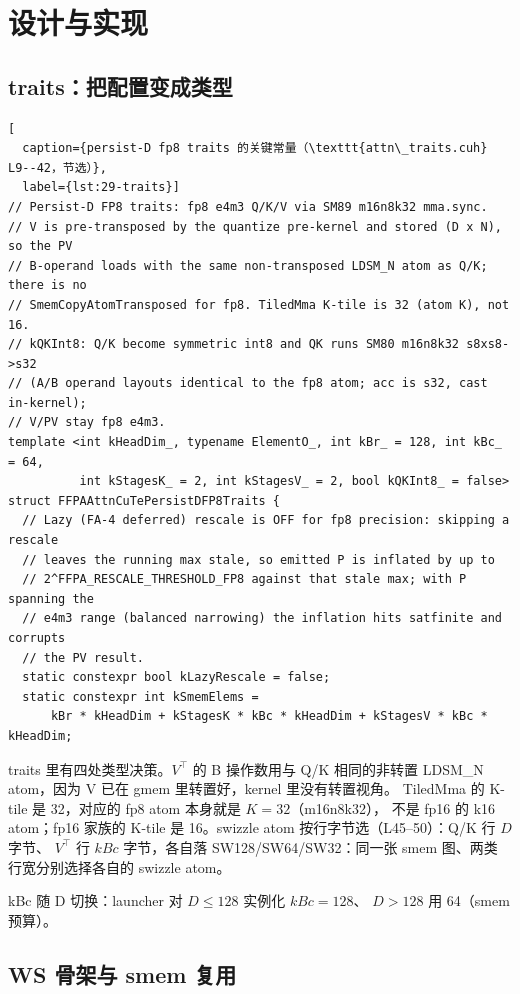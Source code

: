 \section{设计与实现}

\subsection{traits：把配置变成类型}

\begin{lstlisting}[
  caption={persist-D fp8 traits 的关键常量（\texttt{attn\_traits.cuh} L9--42，节选）},
  label={lst:29-traits}]
// Persist-D FP8 traits: fp8 e4m3 Q/K/V via SM89 m16n8k32 mma.sync.
// V is pre-transposed by the quantize pre-kernel and stored (D x N), so the PV
// B-operand loads with the same non-transposed LDSM_N atom as Q/K; there is no
// SmemCopyAtomTransposed for fp8. TiledMma K-tile is 32 (atom K), not 16.
// kQKInt8: Q/K become symmetric int8 and QK runs SM80 m16n8k32 s8xs8->s32
// (A/B operand layouts identical to the fp8 atom; acc is s32, cast in-kernel);
// V/PV stay fp8 e4m3.
template <int kHeadDim_, typename ElementO_, int kBr_ = 128, int kBc_ = 64,
          int kStagesK_ = 2, int kStagesV_ = 2, bool kQKInt8_ = false>
struct FFPAAttnCuTePersistDFP8Traits {
  // Lazy (FA-4 deferred) rescale is OFF for fp8 precision: skipping a rescale
  // leaves the running max stale, so emitted P is inflated by up to
  // 2^FFPA_RESCALE_THRESHOLD_FP8 against that stale max; with P spanning the
  // e4m3 range (balanced narrowing) the inflation hits satfinite and corrupts
  // the PV result.
  static constexpr bool kLazyRescale = false;
  static constexpr int kSmemElems =
      kBr * kHeadDim + kStagesK * kBc * kHeadDim + kStagesV * kBc * kHeadDim;
\end{lstlisting}

traits 里有四处类型决策。$V^{\top}$ 的 B 操作数用与 Q/K 相同的非转置
LDSM\_N atom，因为 V 已在 gmem 里转置好，kernel 里没有转置视角。
TiledMma 的 K-tile 是 32，对应的 fp8 atom 本身就是 $K{=}32$（m16n8k32），
不是 fp16 的 k16 atom；fp16 家族的 K-tile 是 16。swizzle atom 按行字节选（L45--50）：Q/K 行 $D$ 字节、
$V^{\top}$ 行 $kBc$ 字节，各自落 SW128/SW64/SW32：同一张 smem 图、两类
行宽分别选择各自的 swizzle atom。

kBc 随 D 切换：launcher 对 $D\le128$ 实例化 $kBc{=}128$、
$D>128$ 用 64（smem 预算）。

\subsection{WS 骨架与 smem 复用}

